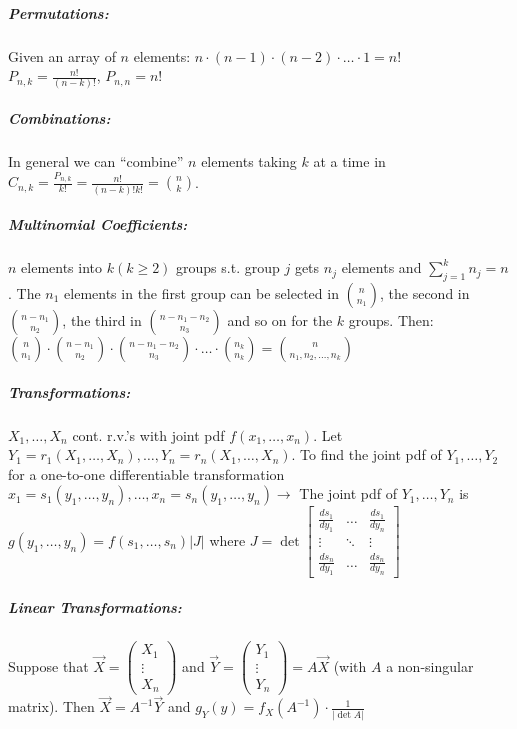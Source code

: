 \documentclass[landscape,10pt]{article}
\begin{document}
\begin{multicols}{4}
\subparagraph*{Permutations: } 
Given an array of \(n\) elements: \(n \cdot (n-1) \cdot (n-2) \cdot \ldots \cdot 1 = n!\) \\
\(P_{n,k} = \frac{n!}{(n-k)!}\), \(P_{n,n} = n!\)

\subparagraph*{Combinations: }
In general we can ``combine'' \(n\) elements taking \(k\) at a time in\\ \(C_{n,k} = \frac{P_{n,k}}{k!} = \frac{n!}{(n-k)!k!} = {n \choose k} \). 

\subparagraph*{Multinomial Coefficients: } 
\(n\) elements into \(k (k \geq 2)\) groups s.t. group \(j\) gets \(n_j\) elements and \(\sum_{j = 1}^{k}n_j = n\). The \(n_1\) elements in the first group can be selected in \({n \choose n_1}\), the second in \({n-n_1 \choose n_2}\), the third in \({n-n_1-n_2 \choose n_3}\) and so on for the \(k\) groups. Then:\\ \({n \choose n_1}\cdot{n-n_1 \choose n_2}\cdot{n-n_1-n_2 \choose n_3}\cdot \ldots \cdot{n_k \choose n_k} = {n \choose n_1, n_2, \ldots, n_k}\)


\subparagraph*{Transformations: }
 \(X_1,\ldots,X_n\) cont. r.v.'s with joint pdf \(f(x_1,\ldots,x_n)\). Let \(Y_1 = r_1(X_1,\ldots,X_n), \dots, Y_n = r_n (X_1, \ldots, X_n)\). To find the joint pdf of \(Y_1, \ldots, Y_2\) for a one-to-one differentiable transformation \(x_1 = s_1 (y_1,\ldots,y_n), \dots, x_n = s_n (y_1, \ldots, y_n) \rightarrow \) The joint pdf of \(Y_1,\ldots,Y_n\) is \(g(y_1,\ldots,y_n) = f(s_1,\ldots,s_n)\left|J\right|\) where \(J = \det \begin{bmatrix}
    \frac{ds_1}{dy_1} & \dots & \frac{ds_1}{dy_n} \\
    \vdots & \ddots & \vdots \\
     \frac{ds_n}{dy_1} & \hdots & \frac{ds_n}{dy_n}
 \end{bmatrix}
 \)

 \subparagraph*{Linear Transformations: } Suppose that 
 \(\vec{X} = 
    \begin{pmatrix}
        X_1\\
        \vdots{}\\ 
        X_n
    \end{pmatrix}\) and 
\(\vec{Y} = 
    \begin{pmatrix}
        Y_1\\
        \vdots{} \\
        Y_n
    \end{pmatrix}
    = A\vec{X}\) (with \(A\) a non-singular matrix). Then \(\vec{X} = A^{-1}\vec{Y}\) and \(g_Y(y) = f_X(A^{-1})\cdot\frac{1}{\left|\det A\right|}\)


\end{multicols}
\end{document}
